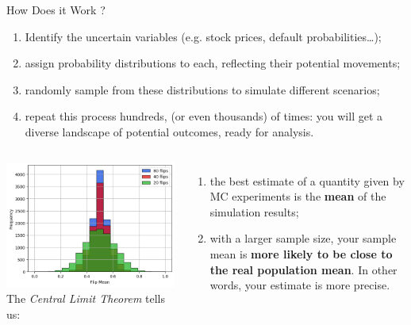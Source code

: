 \documentclass{beamer}
\begin{document}
\begin{frame}{How Does it Work ?}
\begin{enumerate}
	\item Identify the uncertain variables (e.g. stock prices, default probabilities\ldots);
	\item assign probability distributions to each, reflecting their potential movements;
	\item randomly sample from these distributions to simulate different scenarios;
	\item repeat this process hundreds, (or even thousands) of times: you will get a diverse landscape of potential outcomes, ready for analysis.
\end{enumerate}
\vspace{0.25cm}
\begin{columns}
	\hfill
	\includegraphics[width=0.8\linewidth]{central_limit_theorem}
	The \emph{Central Limit Theorem} tells us:
	\begin{enumerate}
		\item the best estimate of a quantity given by MC experiments is the \textbf{mean} of the simulation results;
		\item with a larger sample size, your sample mean is \textbf{more likely to be close to the real population mean}. In other words, your estimate is more precise.
	\end{enumerate}
\end{columns}
\end{frame}
\end{document}

